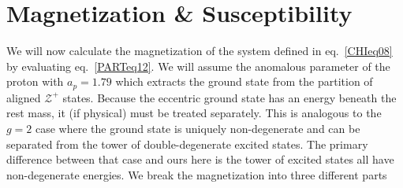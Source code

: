 \documentclass[
aps,
pra,
twocolumn,
showpacs,
preprintnumbers,
amsmath,
amssymb,
footinbib
]{revtex4-2}
\begin{document}
\section{Magnetization \& Susceptibility}\label{sec:MAGsec}
We will now calculate the magnetization of the system defined in eq.~\eqref{CHIeq08} by evaluating eq.~\eqref{PARTeq12}. We will assume the anomalous parameter of the proton with $a_{p}=1.79$ which extracts the ground state from the partition of aligned $\mathcal{Z}^{+}$ states. Because the eccentric ground state has an energy beneath the rest mass, it (if physical) must be treated separately. This is analogous to the $g=2$ case where the ground state is uniquely non-degenerate and can be separated from the tower of double-degenerate excited states. The primary difference between that case and ours here is the tower of excited states all have non-degenerate energies. We break the magnetization into three different parts
\end{document}
